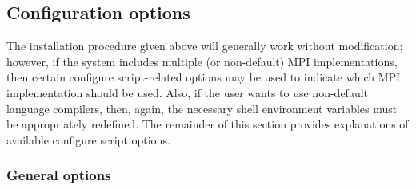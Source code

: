 \documentclass[letterpaper,10pt,english]{sphinxmanual}
\begin{document}
\subsection{Configuration options}
\label{Install:configuration-options}
The installation procedure given above will generally work without
modification; however, if the system includes multiple (or
non-default) MPI implementations, then certain configure
script-related options may be used to indicate which MPI
implementation should be used.  Also, if the user wants to use
non-default language compilers, then, again, the necessary shell
environment variables must be appropriately redefined.  The remainder
of this section provides explanations of available configure script
options.


\subsubsection{General options}
\end{document}

